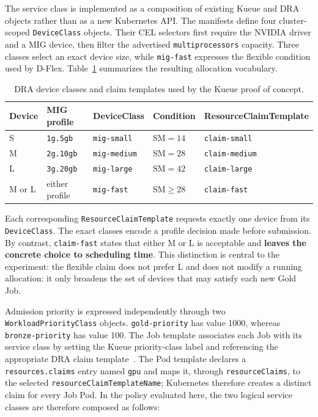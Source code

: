The service class is implemented as a composition of existing Kueue and DRA objects rather than as a new Kubernetes API. The manifests define four cluster-scoped \texttt{DeviceClass} objects. Their CEL selectors first require the NVIDIA driver and a MIG device, then filter the advertised \texttt{multiprocessors} capacity. Three classes select an exact device size, while \texttt{mig-fast} expresses the flexible condition used by D-Flex. Table~\ref{tab:kueue-device-classes} summarizes the resulting allocation vocabulary.

\begin{table}[htbp]
    \centering
    \small
    \caption{DRA device classes and claim templates used by the Kueue proof of concept.}
    \label{tab:kueue-device-classes}
    \begin{tabularx}{\textwidth}{@{}p{}p{}p{}p{}X@{}}
        \toprule
        \textbf{Device} & \textbf{MIG profile} & \textbf{DeviceClass} & \textbf{Condition} & \textbf{ResourceClaimTemplate} \\
        \midrule
        S & \texttt{1g.5gb} & \texttt{mig-small} & $\mathrm{SM}=14$ & \texttt{claim-small} \\
        M & \texttt{2g.10gb} & \texttt{mig-medium} & $\mathrm{SM}=28$ & \texttt{claim-medium} \\
        L & \texttt{3g.20gb} & \texttt{mig-large} & $\mathrm{SM}=42$ & \texttt{claim-large} \\
        M or L & either profile & \texttt{mig-fast} & $\mathrm{SM}\geq 28$ & \texttt{claim-fast} \\
        \bottomrule
    \end{tabularx}
\end{table}

Each corresponding \texttt{ResourceClaimTemplate} requests exactly one device from its \texttt{DeviceClass}. The exact classes encode a profile decision made before submission. By contrast, \texttt{claim-fast} states that either M or L is acceptable and \textbf{leaves the concrete choice to scheduling time}. This distinction is central to the experiment: the flexible claim does not prefer L and does not modify a running allocation: it only broadens the set of devices that may satisfy each new Gold Job.

Admission priority is expressed independently through two \texttt{WorkloadPriorityClass} objects. \texttt{gold-priority} has value 1000, whereas \texttt{bronze-priority} has value 100. The Job template associates each Job with its service class by setting the Kueue priority-class label and referencing the appropriate DRA claim template~\cite{kueue2026workloadpriority}. The Pod template declares a \texttt{resources.claims} entry named \texttt{gpu} and maps it, through \texttt{resourceClaims}, to the selected \texttt{resourceClaimTemplateName}; Kubernetes therefore creates a distinct claim for every Job Pod. In the policy evaluated here, the two logical service classes are therefore composed as follows:

